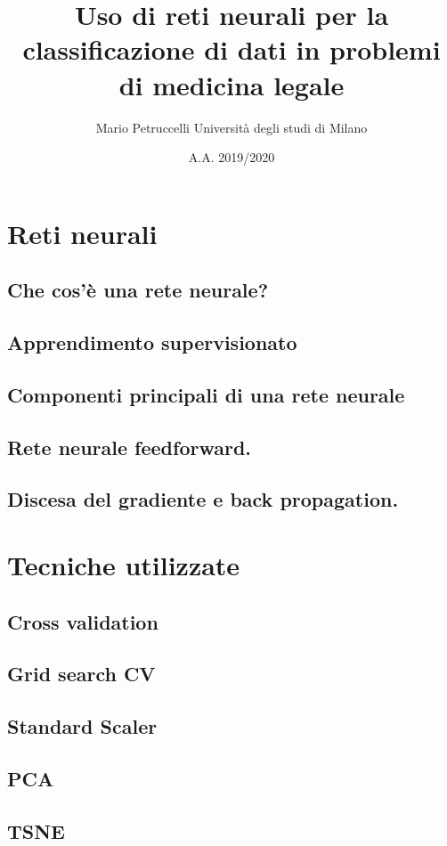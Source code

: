 \documentclass[12pt, twoside, letterpaper]{article}
\title{Uso di reti neurali per la classificazione di dati in problemi di medicina legale}
\author{Mario Petruccelli \cr Università degli studi di Milano}
\date{A.A. 2019/2020}
\begin{document}
	\begin{titlepage}
		\maketitle
		\newpage
		\tableofcontents
	\end{titlepage}


	\section{Reti neurali}
		\subsection{Che cos'è una rete neurale?}
		\subsection{Apprendimento supervisionato}
		\subsection{Componenti principali di una rete neurale}
		\subsection{Rete neurale feedforward.}
		\subsection{Discesa del gradiente e back propagation.}
	\section{Tecniche utilizzate}
		\subsection{Cross validation}
		\subsection{Grid search CV}
		\subsection{Standard Scaler}
		\subsection{PCA}
		\subsection{TSNE}
\end{document}
